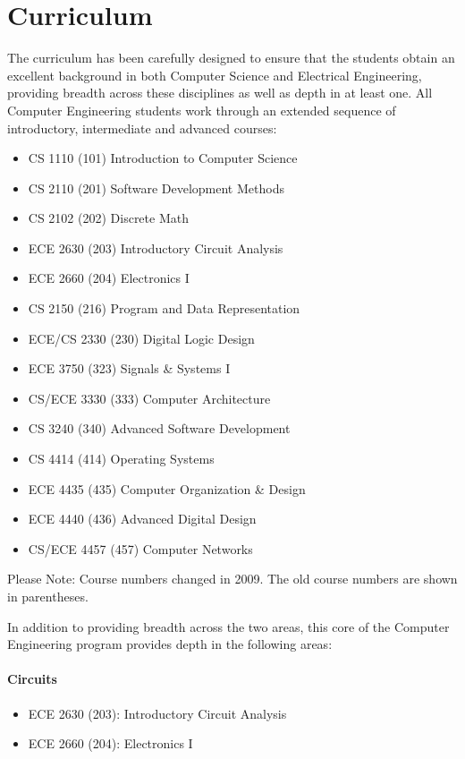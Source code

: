 \documentclass[10pt,letter]{book}
\newenvironment{itemlist}{
\begin{itemize}
\setlength{\itemsep}{0pt}
\setlength{\parskip}{0pt}}
{\end{itemize}}
\newcommand{\mysection}[1]{\section{#1}\renewcommand{\rightmark}{#1}}
\begin{document}
\mysection{Curriculum} %

The curriculum has been carefully designed to ensure that the students
obtain an excellent background in both Computer Science and Electrical
Engineering, providing breadth across these disciplines as well as
depth in at least one. All Computer Engineering students work through
an extended sequence of introductory, intermediate and advanced
courses:

\begin{itemlist}
\item CS 1110 (101) Introduction to Computer Science
\item CS 2110 (201) Software Development Methods
\item CS 2102 (202) Discrete Math
\item ECE 2630 (203) Introductory Circuit Analysis
\item ECE 2660 (204) Electronics I
\item CS 2150 (216) Program and Data Representation
\item ECE/CS 2330 (230) Digital Logic Design
\item ECE 3750 (323) Signals \& Systems I
\item CS/ECE 3330 (333) Computer Architecture
\item CS 3240 (340) Advanced Software Development
\item CS 4414 (414) Operating Systems
\item ECE 4435 (435) Computer Organization \& Design
\item ECE 4440 (436) Advanced Digital Design
\item CS/ECE 4457 (457) Computer Networks
\end{itemlist}

Please Note: Course numbers changed in 2009. The old course numbers
are shown in parentheses.

In addition to providing breadth across the two areas,
this core of the Computer Engineering program provides
depth in the following areas:

\paragraph{Circuits}
\begin{itemlist}
\item ECE 2630 (203): Introductory Circuit Analysis
\item ECE 2660 (204): Electronics I
\end{itemlist}
\end{document}
